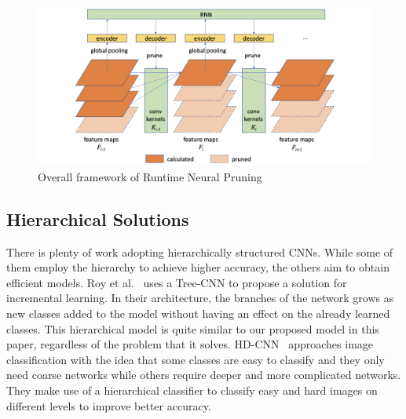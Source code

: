\begin{figure}
    \centering
    \includegraphics[width=\textwidth]{thesis/images/runtimenp-fig.png}
    \caption{Overall framework of Runtime Neural Pruning\cite{Lin2017RuntimeNP}}
    \label{fig:runtimenp}
\end{figure}

\subsection*{Hierarchical Solutions}

There is plenty of work adopting hierarchically structured CNNs. 
While some of them employ the hierarchy to achieve higher accuracy, the others aim to obtain efficient models.
Roy et al.~\cite{roy2018tree} uses a Tree-CNN to propose a solution for incremental learning. 
In their architecture, the branches of the network grows as new classes added to the model without having an effect on the already learned classes. 
This hierarchical model is quite similar to our proposed model in this paper, regardless of the problem that it solves. 
HD-CNN~\cite{Yan_2015_ICCV} approaches image classification with the idea that some classes are easy to classify and they only need coarse networks while others require deeper and more complicated networks. 
They make use of a hierarchical classifier to classify easy and hard images on different levels to improve better accuracy. 

